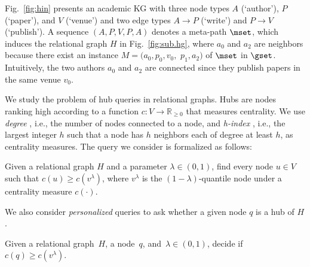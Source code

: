 \begin{example}
  Fig.~\ref{fig:hin} presents an academic KG with three node types $A$ (`author'), $P$ (`paper'), and $V$ (`venue') and two edge types $A \rightarrow P$ (`write') and $P \rightarrow V$ (`publish').
  A sequence $(A, P, V, P, A)$ denotes a meta-path $\mset$, which induces the relational graph $H$ in Fig.~\ref{fig:sub.hg}, where $a_0$ and $a_2$ are neighbors because there exist an instance $M = (a_0, p_0, v_0,$ $p_1, a_2)$ of $\mset$ in $\gset$.
  Intuitively, the two authors $a_0$ and $a_2$ are connected since they publish papers in the same venue $v_0$.
\end{example}

We study the problem of hub queries in relational graphs.
Hubs are nodes ranking high according to a function $c: V \rightarrow \mathbb{R}_{\geq 0}$ that measures centrality.
We use \emph{degree} \cite{DasSP18}, i.e., the number of nodes connected to a node, and \emph{h-index} \cite{LuZZS16}, i.e., the largest integer $h$ such that a node has $h$ neighbors each of degree at least $h$, as centrality measures.
The \ced query we consider is formalized as follows:
\begin{problem}\label{def:hub}
  Given a relational graph $H$ and a parameter $\lambda\in(0,1)$, find every node $u \in V$ such that $c(u) \geq c(v^{\lambda})$, where $v^{\lambda}$ is the $(1-\lambda)$-quantile node under a centrality measure $c(\cdot)$.
\end{problem}
We also consider \emph{personalized} \ced queries to ask whether a given node $q$ is a hub of $H$.
\begin{problem}\label{problem:exactPer}
  Given a relational graph~$H$, a node~$q$, and~$\lambda \in (0,1)$, decide if~$c(q) \geq c(v^\lambda)$.
\end{problem}

